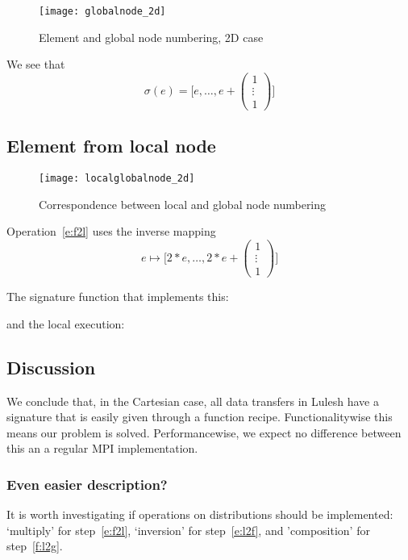 \documentclass[11pt,fleqn,preprint]{impreport}
\begin{document}
\begin{figure}[ht]
  \texttt{[image: globalnode\_2d]}
  \caption{Element and global node numbering, 2D case}
  \label{fig:globalnode_2d}
\end{figure}

We see that
\[ \sigma(e) = \bigl[e,\ldots,e+{\scriptscriptstyle
    \begin{pmatrix}
      1\\ \vdots\\ 1
    \end{pmatrix}
    }\bigr]
\]

\pagebreak
\subsection{Element from local node}
%
\begin{figure}[ht]
  \texttt{[image: localglobalnode\_2d]}
  \caption{Correspondence between local and global node numbering}
  \label{fig:local2element}
\end{figure}
%
Operation~\ref{e:f2l} uses the inverse mapping
\[ e\mapsto \bigl[ 2*e,\ldots,2*e+
   {\scriptstyle \begin{pmatrix} 1\\ \vdots\\ 1 \end{pmatrix}}
   \bigr]
\]

The signature function that implements this:

and the local execution:

\pagebreak
\subsection{Discussion}

We conclude that, in the Cartesian case, all data transfers in Lulesh
have a signature that is easily
given through a function recipe. Functionalitywise this means our
problem is solved. Performancewise, we expect no difference between
this an a regular MPI implementation.

\subsubsection{Even easier description?}
 
It is worth investigating if operations on distributions should be
implemented: `multiply' for step~\ref{e:f2l}, `inversion' for
step~\ref{e:l2f}, and 'composition' for step~\ref{f:l2g}.
\end{document}
